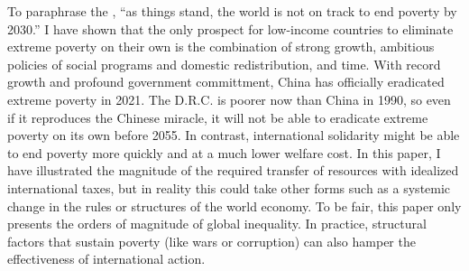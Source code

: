 To paraphrase the \cite{un_sustainable_2022}, ``as things stand, the world is not on track to end poverty by 2030.'' I have shown that the only prospect for low-income countries to eliminate extreme poverty on their own is the combination of strong growth, ambitious policies of social programs and domestic redistribution, and time. 
With record growth and profound government committment, China has officially eradicated extreme poverty in 2021. The D.R.C. is poorer now than China in 1990, %
so even if it reproduces the Chinese miracle, it will not be able to eradicate extreme poverty on its own before 2055. 
In contrast, international solidarity might be able to end poverty more quickly and at a much lower welfare cost. In this paper, I have illustrated the magnitude of the required transfer of resources with idealized international taxes, but in reality this could take other forms such as a systemic change in the rules or structures of the world economy. 
To be fair, this paper only presents the orders of magnitude of global inequality. %
In practice, structural factors that sustain poverty (like wars or corruption) %
can also hamper the effectiveness of international action. %


